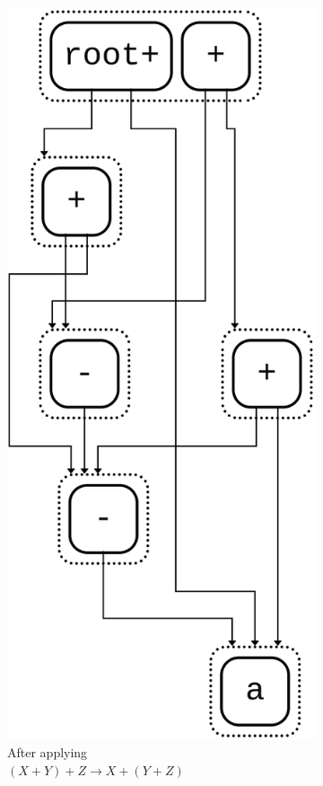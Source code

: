 \begin{figure}[h]
\begin{subfigure}[t]{0.27\textwidth}
		\includegraphics[width=1.19\textwidth,height=1.19\textwidth,keepaspectratio=true]{img/e_graph2.png}
		\caption{\scriptsize After applying\\$(X + Y) + Z \to X + (Y + Z)$}
		\label{fig:e-graph-sub2}
	\end{subfigure}
	\hfill
	\begin{subfigure}[t]{0.23\textwidth}
		\centering

\end{subfigure}
\end{figure}
